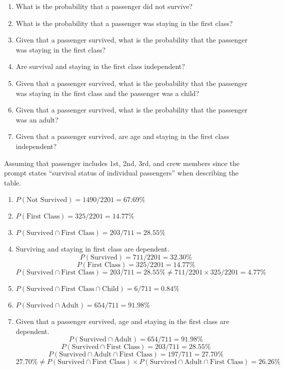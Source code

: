 \documentclass{homework}
\begin{document}
\begin{problem}[6]
    \begin{enumerate}
        \item What is the probability that a passenger did not survive? 
        \item What is the probability that a passenger was staying in the first class?
        \item Given that a passenger survived, what is the probability that the passenger was staying in the first class?
        \item Are survival and staying in the first class independent?
        \item Given that a passenger survived, what is the probability that the passenger was staying in the first class and the passenger was a child?
        \item Given that a passenger survived, what is the probability that the passenger was an adult?
        \item Given that a passenger survived, are age and staying in the first class independent? 
    \end{enumerate}
\end{problem}

\newpage
\begin{solution}

    Assuming that passenger includes 1st, 2nd, 3rd, and crew members since the prompt states ``survival status of individual passengers'' when describing the table. 

    \begin{enumerate}
        \item $P(\text{Not Survived}) = 1490 / 2201 = 67.69\%$
        \item $P(\text{First Class}) = 325 / 2201 = 14.77\%$
        \item $P(\text{Survived} \cap \text{First Class}) = 203/711 = 28.55\%$
        \item Surviving and staying in first class are dependent.
            $$
                P(\text{Survived}) = 711/2201 = 32.30\%
            $$
            $$
                P(\text{First Class}) = 325/2201 = 14.77\%
            $$
            $$
                P(\text{Survived} \cap \text{First Class}) = 203/711 = 28.55\% \neq 711/2201 \times 325/2201 = 4.77\%
            $$
        \item $P(\text{Survived} \cap \text{First Class} \cap \text{Child}) = 6/711 = 0.84 \%$
        \item $P(\text{Survived} \cap \text{Adult}) = 654/711 = 91.98 \%$
        \item Given that a passenger survived,  age and staying in the first class are dependent.
            $$
            P(\text{Survived} \cap \text{Adult}) = 654/711 = 91.98 \%
            $$
            $$
                P(\text{Survived} \cap \text{First Class}) = 203/711 = 28.55 \%
            $$
            $$
                P(\text{Survived} \cap \text{Adult} \cap \text{First Class}) = 197/711 = 27.70 \%
            $$
            $$
                27.70 \% \neq P(\text{Survived} \cap \text{First Class}) \times P(\text{Survived} \cap \text{Adult} \cap \text{First Class})  = 26.26 \%
            $$
        \end{enumerate}
\end{solution}
\end{document}
